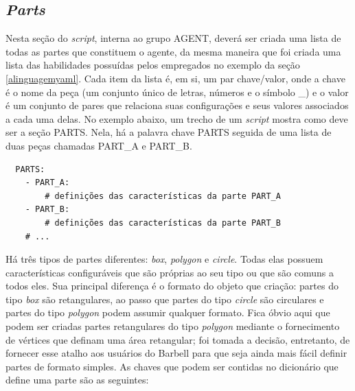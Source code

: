 \documentclass[cic,tc]{iiufrgs}
\begin{document}
\subsection{\textit{Parts}}
\label{parts}
  Nesta seção do \textit{script}, interna ao grupo AGENT, deverá ser criada uma lista de todas as partes que constituem o agente, da mesma maneira que foi criada
  uma lista das habilidades possuídas pelos empregados no exemplo da seção \ref{alinguagemyaml}. Cada item da lista é, em si, um par chave/valor, onde a chave é
  o nome da peça (um conjunto único de letras, números e o símbolo \_) e o valor é um conjunto de pares que relaciona suas configurações e seus valores associados
  a cada uma delas. No exemplo abaixo, um trecho de um \textit{script} mostra como deve ser a seção PARTS. Nela, há a palavra chave PARTS seguida de uma lista de
  duas peças chamadas PART\_A e PART\_B.

  \begin{verbatim}
  PARTS:
    - PART_A:
        # definições das características da parte PART_A
    - PART_B:
        # definições das características da parte PART_B
    # ...
  \end{verbatim}

Há três tipos de partes diferentes: \textit{box}, \textit{polygon} e \textit{circle}. Todas elas possuem características configuráveis que são próprias ao seu tipo
ou que são comuns a todos eles. Sua principal diferença é o formato do objeto que criação: partes do tipo \textit{box} são retangulares, ao passo que partes do tipo
\textit{circle} são circulares e partes do tipo \textit{polygon} podem assumir qualquer formato. Fica óbvio aqui que podem ser criadas partes retangulares do tipo
\textit{polygon} mediante o fornecimento de vértices que definam uma área retangular; foi tomada a decisão, entretanto, de fornecer esse atalho aos usuários do Barbell
para que seja ainda mais fácil definir partes de formato simples. As chaves que podem ser contidas no dicionário que define uma parte são as seguintes:
\end{document}
